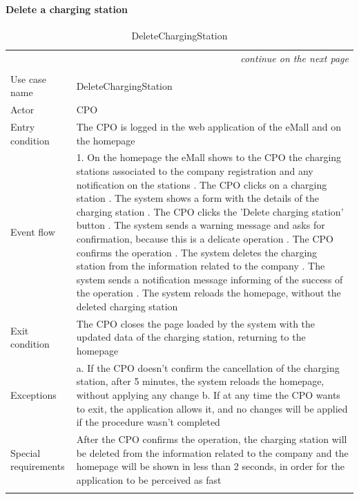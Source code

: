 \paragraph{Delete a charging station}
\begin{center}
    \begin{longtable}{p{4cm} p{11cm}}
    \multicolumn{2}{r}{\itshape{continue on the next page}}\\
    \endfoot 
    \\
    \endlastfoot
    \hline
     Use case name &  DeleteChargingStation\\
     \hline
     Actor & CPO \\
     \hline
     Entry condition & The CPO is logged in the web application of the eMall and on the homepage \\
     \hline
     Event flow &   1. On the homepage the eMall shows to the CPO the charging stations associated to the company                   registration and any notification on the stations \newline
                    2. The CPO clicks on a charging station \newline 
                    3. The system shows a form with the details of the charging station \newline
                    4. The CPO clicks the 'Delete charging station' button \newline
                    5. The system sends a warning message and asks for confirmation, because this is a delicate operation \newline
                    6. The CPO confirms the operation \newline
                    7. The system deletes the charging station from the information related to the company \newline
                    8. The system sends a notification message informing of the success of the operation \newline
                    9. The system reloads the homepage, without the deleted charging station\\
     \hline
     Exit condition &  The CPO closes the page loaded by the system with the updated data of the charging station, returning to the homepage \\
     \hline
     Exceptions &   a. If the CPO doesn't confirm the cancellation of the charging station, after 5 minutes, the                    system reloads the homepage, without applying any change \newline
                    b. If at any time the CPO wants to exit, the application allows it, and no changes will be applied if the procedure wasn't completed \\
     \hline
     Special requirements & After the CPO confirms the operation, the charging station will be deleted from the information related to the company and the homepage will be shown in less than 2 seconds, in order for the application to be perceived as fast\\
     \hline
    \caption{DeleteChargingStation}
    \label{tab:DeleteChargingStation}
    \end{longtable}
\end{center}

